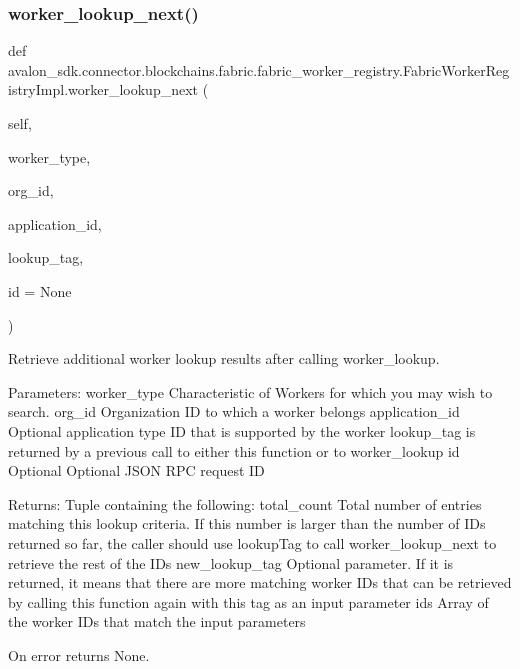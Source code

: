 \subsubsection{\texorpdfstring{worker\+\_\+lookup\+\_\+next()}{worker\_lookup\_next()}}
{\footnotesize\ttfamily def avalon\+\_\+sdk.\+connector.\+blockchains.\+fabric.\+fabric\+\_\+worker\+\_\+registry.\+Fabric\+Worker\+Registry\+Impl.\+worker\+\_\+lookup\+\_\+next (\begin{DoxyParamCaption}\item[{}]{self,  }\item[{}]{worker\+\_\+type,  }\item[{}]{org\+\_\+id,  }\item[{}]{application\+\_\+id,  }\item[{}]{lookup\+\_\+tag,  }\item[{}]{id = {\ttfamily None} }\end{DoxyParamCaption})}

\begin{DoxyVerb}Retrieve additional worker lookup results after calling worker_lookup.

Parameters:
worker_type         Characteristic of Workers for which you may wish
            to search.
org_id              Organization ID to which a worker belongs
application_id      Optional application type ID that is
            supported by the worker
lookup_tag          is returned by a previous call to either this
            function or to worker_lookup
id                  Optional Optional JSON RPC request ID

Returns:
Tuple containing the following:
total_count    Total number of entries matching this lookup
       criteria.  If this number is larger than the number
       of IDs returned so far, the caller should use
       lookupTag to call worker_lookup_next to retrieve
       the rest of the IDs
new_lookup_tag Optional parameter. If it is returned, it
       means that there are more matching worker IDs that
       can be retrieved by calling this function again with
       this tag as an input parameter
ids            Array of the worker IDs that match the input parameters

On error returns None.
\end{DoxyVerb}
 \mbox{\label{classavalon__sdk_1_1connector_1_1blockchains_1_1fabric_1_1fabric__worker__registry_1_1FabricWorkerRegistryImpl_af78f67f5545b5bdcf1ae7a2012b7416a}} 
